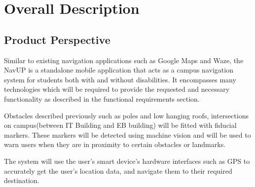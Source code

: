 \section{Overall Description}

	\subsection{Product Perspective}
		Similar to existing navigation applications such as Google Maps and Waze, the NavUP is a standalone mobile application that acts as a campus navigation system for students both with and without disabilities. It encompasses many technologies which will be required to provide the requested and necessary functionality as described in the functional requirements section.\\ \par\noindent
		Obstacles described previously such as poles and low hanging roofs, intersections on campus(between IT Building and EB building) will be fitted with fiducial markers. These markers will be detected using machine vision and will be used to warn users when they are in proximity to certain obstacles or landmarks.\par\noindent
		The system will use the user's smart device's hardware interfaces such as GPS to accurately get the user's location data, and navigate them to their required destination.\\
		
